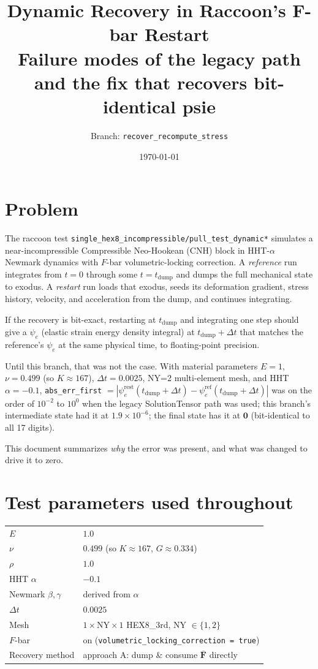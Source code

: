 \documentclass[11pt]{article}
\title{Dynamic Recovery in Raccoon's F-bar Restart\\
       \large Failure modes of the legacy path and the fix that recovers bit-identical psie}
\author{Branch: \texttt{recover\_recompute\_stress}}
\date{\today}
\newcommand{\F}{\mathbf{F}}
\newcommand{\Fbar}{\overline{\F}}
\begin{document}
\maketitle

\section{Problem}

The raccoon test \texttt{single\_hex8\_incompressible/pull\_test\_dynamic*} simulates a near-incompressible Compressible Neo-Hookean (CNH) block in HHT-$\alpha$ Newmark dynamics with $F$-bar volumetric-locking correction. A \emph{reference} run integrates from $t=0$ through some $t = t_{\text{dump}}$ and dumps the full mechanical state to exodus. A \emph{restart} run loads that exodus, seeds its deformation gradient, stress history, velocity, and acceleration from the dump, and continues integrating.

If the recovery is bit-exact, restarting at $t_{\text{dump}}$ and integrating one step should give a $\psi_e$ (elastic strain energy density integral) at $t_{\text{dump}}+\Delta t$ that matches the reference's $\psi_e$ at the same physical time, to floating-point precision.

Until this branch, that was not the case. With material parameters $E=1$, $\nu=0.499$ (so $K \approx 167$), $\Delta t = 0.0025$, NY=2 multi-element mesh, and HHT $\alpha = -0.1$, \texttt{abs\_err\_first} $= |\psi_e^{\text{rest}}(t_{\text{dump}}+\Delta t) - \psi_e^{\text{ref}}(t_{\text{dump}}+\Delta t)|$ was on the order of $10^{-2}$ to $10^0$ when the legacy SolutionTensor path was used; this branch's intermediate state had it at $1.9 \times 10^{-6}$; the final state has it at $\mathbf{0}$ (bit-identical to all 17 digits).

This document summarizes \emph{why} the error was present, and what was changed to drive it to zero.

\section{Test parameters used throughout}

\begin{center}
\begin{tabular}{ll}
\toprule
$E$ & $1.0$ \\
$\nu$ & $0.499$ (so $K \approx 167$, $G \approx 0.334$) \\
$\rho$ & $1.0$ \\
HHT $\alpha$ & $-0.1$ \\
Newmark $\beta, \gamma$ & derived from $\alpha$ \\
$\Delta t$ & $0.0025$ \\
Mesh & $1 \times \text{NY} \times 1$ HEX8\_3rd, NY $\in \{1, 2\}$ \\
$F$-bar & on (\texttt{volumetric\_locking\_correction = true}) \\
Recovery method & approach A: dump \& consume $\Fbar$ directly \\
\bottomrule
\end{tabular}
\end{center}
\end{document}
